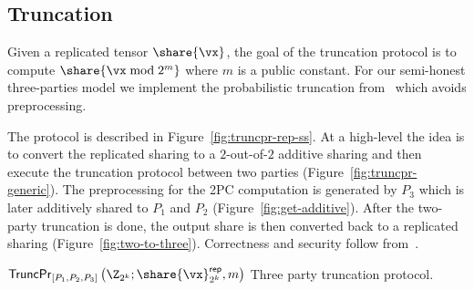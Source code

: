 \subsection{Truncation}
\label{subsec:truncation}

Given a replicated tensor $\share{\vx}$, the goal of the truncation protocol is to compute $\share{\vx \bmod 2^m}$ where $m$ is a public constant.
For our semi-honest three-parties model we implement the probabilistic truncation from~\cite{PoPETS:DalEscKel20} which avoids preprocessing.

The protocol is described in Figure~\ref{fig:truncpr-rep-ss}. At a high-level
the idea is to convert the replicated sharing to a $2$-out-of-$2$ additive sharing and
then execute the truncation protocol between two parties
(Figure~\ref{fig:truncpr-generic}). The preprocessing for the 2PC computation is
generated by $P_3$ which is later additively shared to $P_1$ and $P_2$
(Figure~\ref{fig:get-additive}). After the two-party truncation is done, the
output share is then converted back to a replicated sharing
(Figure~\ref{fig:two-to-three}). Correctness and security follow
from~\cite{PoPETS:DalEscKel20}.


\msubsubsection
  {$\mathsf{TruncPr}_{[P_1, P_2, P_3]} \left(\Z_{2^k}; \share{\vx}^{\mathsf{rep}}_{2^k}, m \right)$}
  \label{fig:truncpr-rep-ss}
  Three party truncation protocol.

